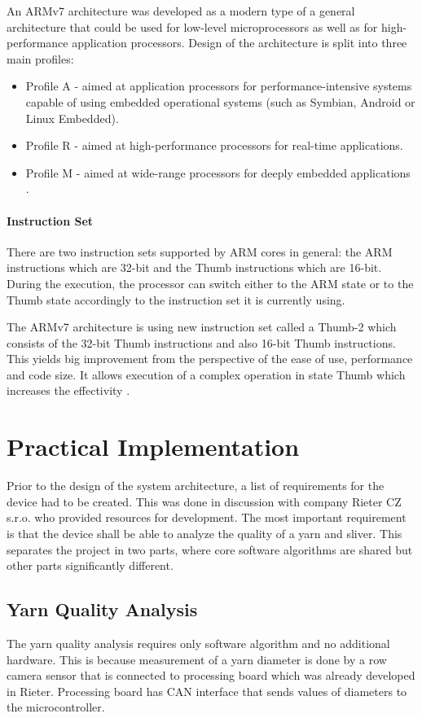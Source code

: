 \documentclass[twoside]{ctuthesis}
\theoremstyle{plain}
\theoremstyle{definition}
\theoremstyle{note}
\begin{document}
An ARMv7 architecture was developed as a modern type of a general architecture that could be used for low-level microprocessors as well as for high-performance application processors. Design of the architecture is split into three main profiles:
\begin{itemize}
	\setlength{\itemsep}{5pt}
	\item Profile A - aimed at application processors for performance-intensive systems capable of using embedded operational systems (such as Symbian, Android or Linux Embedded).
	\item Profile R - aimed at high-performance processors for real-time applications.
	\item Profile M - aimed at wide-range processors for deeply embedded applications \cite{cite:ARM-M3}.
\end{itemize}

\subsubsection{Instruction Set}
There are two instruction sets supported by ARM cores in general: the ARM instructions which are 32-bit and the Thumb instructions which are 16-bit. During the execution, the processor can switch either to the ARM state or to the Thumb state accordingly to the instruction set it is currently using.

The ARMv7 architecture is using new instruction set called a Thumb-2 which consists of the 32-bit Thumb instructions and also 16-bit Thumb instructions. This yields big improvement from the perspective of the ease of use, performance and code size. It allows execution of a complex operation in state Thumb which increases the effectivity \cite{cite:ARM-M3}.

\chapter{Practical Implementation}
Prior to the design of the system architecture, a list of requirements for the device had to be created. This was done in discussion with company Rieter CZ s.r.o. who provided resources for development. The most important requirement is that the device shall be able to analyze the quality of a yarn and sliver. This separates the project in two parts, where core software algorithms are shared but other parts significantly different. 

\section{Yarn Quality Analysis}
The yarn quality analysis requires only software algorithm and no additional hardware. This is because measurement of a yarn diameter is done by a row camera sensor that is connected to processing board which was already developed in Rieter. Processing board has CAN interface that sends values of diameters to the microcontroller. 
\end{document}
